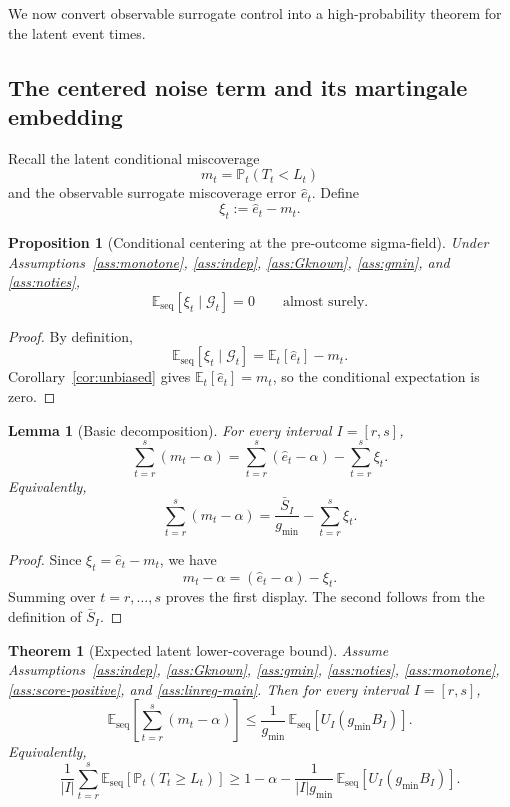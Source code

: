 \documentclass[11pt]{article}
\newtheorem{theorem}{Theorem}
\newtheorem{proposition}{Proposition}
\newtheorem{lemma}{Lemma}
\newcommand{\E}{\mathbb{E}}
\newcommand{\Prob}{\mathbb{P}}
\newcommand{\1}{\mathbf{1}}
\newcommand{\seq}{\mathrm{seq}}
\newcommand{\cG}{\mathcal{G}}
\begin{document}
We now convert observable surrogate control into a high-probability theorem for the latent event times.

\subsection{The centered noise term and its martingale embedding}

Recall the latent conditional miscoverage
\[
m_t=\Prob_t(T_t< L_t)
\]
and the observable surrogate miscoverage error $\hat e_t$. Define
\[
\xi_t:=\hat e_t-m_t.
\]

\begin{proposition}[Conditional centering at the pre-outcome sigma-field]
\label{prop:mds-main}
Under Assumptions~\ref{ass:monotone}, \ref{ass:indep}, \ref{ass:Gknown}, \ref{ass:gmin}, and \ref{ass:noties},
\[
\E_{\seq}[\xi_t\mid \cG_t]=0
\qquad\text{almost surely.}
\]
\end{proposition}

\begin{proof}
By definition,
\[
\E_{\seq}[\xi_t\mid \cG_t]
=
\E_t[\hat e_t]-m_t.
\]
Corollary~\ref{cor:unbiased} gives $\E_t[\hat e_t]=m_t$, so the conditional expectation is zero.
\end{proof}

\begin{lemma}[Basic decomposition]
\label{lem:basic-decomp-main}
For every interval $I=[r,s]$,
\begin{equation}
\label{eq:basic-decomp}
\sum_{t=r}^s(m_t-\alpha)
=
\sum_{t=r}^s(\hat e_t-\alpha)-\sum_{t=r}^s\xi_t.
\end{equation}
Equivalently,
\[
\sum_{t=r}^s(m_t-\alpha)
=
\frac{\bar S_I}{g_{\min}}-\sum_{t=r}^s\xi_t.
\]
\end{lemma}

\begin{proof}
Since $\xi_t=\hat e_t-m_t$, we have
\[
m_t-\alpha=(\hat e_t-\alpha)-\xi_t.
\]
Summing over $t=r,\dots,s$ proves the first display. The second follows from the definition of $\bar S_I$.
\end{proof}

\begin{theorem}[Expected latent lower-coverage bound]
\label{thm:expectation-main}
Assume Assumptions~\ref{ass:indep}, \ref{ass:Gknown}, \ref{ass:gmin}, \ref{ass:noties}, \ref{ass:monotone}, \ref{ass:score-positive}, and \ref{ass:linreg-main}. Then for every interval $I=[r,s]$,
\[
\E_{\seq}\!\left[\sum_{t=r}^s(m_t-\alpha)\right]
\le
\frac{1}{g_{\min}}\,\E_{\seq}\!\left[U_I(g_{\min}B_I)\right].
\]
Equivalently,
\[
\frac{1}{|I|}\sum_{t=r}^s \E_{\seq}\!\left[\Prob_t(T_t\ge L_t)\right]
\ge
1-\alpha-
\frac{1}{|I|g_{\min}}\,\E_{\seq}\!\left[U_I(g_{\min}B_I)\right].
\]
\end{theorem}
\end{document}
